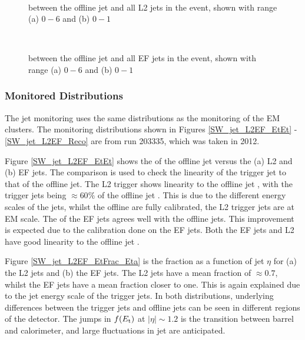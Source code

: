 \begin{figure}
\centering
\mbox{
              \quad
              \quad
                              }
\caption[\dr{} between offline and L2 jets]{\dr{} between the offline jet and all L2 jets in the event, shown with range (a) $0 - 6$ and (b) $0 - 1$ \label{SW_jet_L2_dR}}
\end{figure}

\begin{figure}
\centering
\mbox{
              \quad
              \quad
                              }
\caption[\dr{} between offline and EF jets]{\dr{} between the offline jet and all EF jets in the event, shown with range (a) $0 - 6$ and (b) $0 - 1$ \label{SW_jet_EF_dR}}
\end{figure}



\subsubsection{Monitored Distributions}

The jet monitoring uses the same distributions as the monitoring of the EM clusters.
The monitoring distributions shown in Figures \ref{SW_jet_L2EF_EtEt} - \ref{SW_jet_L2EF_Reco} are from run 203335, which was taken in 2012.

Figure \ref{SW_jet_L2EF_EtEt} shows the \et{} of the offline jet versus the (a) L2 and (b) EF jets.
The \et{} comparison is used to check the linearity of the trigger jet \et{} to that of the offline jet.
The L2 trigger \et{} shows linearity to the offline jet \et{}, with the trigger jets \et{} being $\approx 60 \%$ of the offline jet \et{}. 
This is due to the different energy scales of the jets, whilst the offline are fully calibrated, the L2 trigger jets are at EM scale.
The \et{} of the EF jets agrees well with the offline jets. 
This improvement is expected due to the calibration done on the EF jets.
Both the EF jets and L2 have good linearity to the offline jet \et{}.

Figure \ref{SW_jet_L2EF_EtFrac_Eta} is the \et{} fraction as a function of jet $\eta$ for (a) the L2 jets and (b) the EF jets.
The L2 jets have a mean \et{} fraction of $\approx 0.7$, whilst the EF jets have a mean \et{} fraction closer to one.  
This is again explained due to the jet energy scale of the trigger jets.
In both distributions, underlying differences between the trigger jets and offline jets can be seen in different regions of the detector.
The jumps in $f(\mbox{$E_{\rm t}$}{})$ at $|\eta|\sim1.2$ is the transition between barrel and calorimeter, and large fluctuations in jet \pt{} are anticipated.


